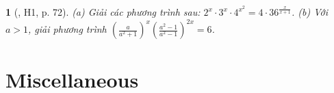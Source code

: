 \documentclass{article}
\newtheorem{baitoan}{}
\begin{document}
\begin{baitoan}[\cite{TLCT_giai_tich_12}, H1, p. 72]
	(a) Giải các phương trình sau: $2^x\cdot 3^x\cdot 4^{x^2} = 4\cdot 36^{\frac{x}{x + 1}}$. (b) Với $a > 1$, giải phương trình $\left(\frac{a}{a^2 + 1}\right)^x\left(\frac{a^2 - 1}{a^2 - 1}\right)^{2x} = 6$.
\end{baitoan}


\section{Miscellaneous}


\printbibliography[heading=bibintoc]
	
\end{document}
